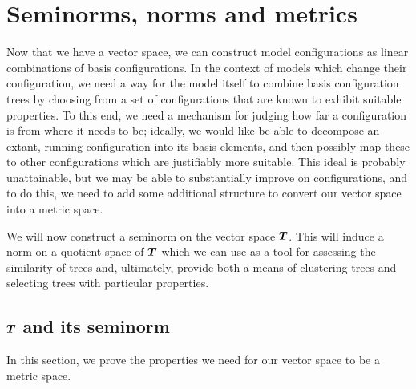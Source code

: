 \section{Seminorms, norms and metrics} %

Now that we have a vector space, we can construct model configurations
as linear combinations of basis configurations. In the context of
models which change their configuration, we need a way for the model
itself to combine basis configuration trees by choosing from a set of
configurations that are known to exhibit suitable properties.  To this
end, we need a mechanism for judging how far a configuration is from
where it needs to be; ideally, we would like be able to decompose an
extant, running configuration into its basis elements, and then
possibly map these to other configurations which are justifiably more
suitable. This ideal is probably unattainable, but we may be able to
substantially improve on configurations, and to do this, we need to
add some additional structure to convert our vector space into a
metric space.

We will now construct a seminorm on the vector space
$\boldsymbol{T}$. This will induce a norm on a quotient space of $\boldsymbol{T}$ which we
can use as a tool for assessing the similarity of trees and,
ultimately, provide both a means of clustering trees and selecting
trees with particular properties.

\subsection{$\boldsymbol{T}$ and its seminorm}
In this section, we prove the properties we need for our vector space
to be a metric space. 

